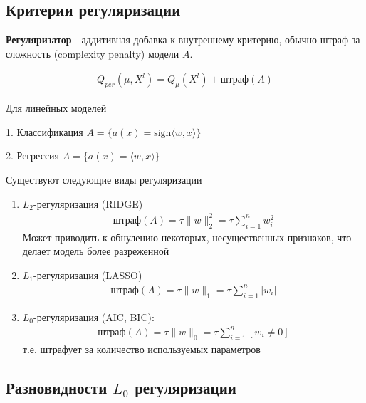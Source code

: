 \subsection*{Критерии регуляризации}

\par \textbf{Регуляризатор} - аддитивная добавка к внутреннему критерию, обычно штраф за сложность (complexity penalty) модели $A$.

\begin{align*}
    Q_{per} (\mu, X^l) = Q_{\mu}(X^l) + \text{штраф}(A)
\end{align*}


\par Для линейных моделей

1. Классификация $A = \{a(x) = \text{sign}\langle w, x \rangle\}$

2. Регрессия $A = \{a(x) = \langle w, x \rangle \}$

\par Существуют следующие виды регуляризации

\begin{enumerate}
    \item $L_2$-регуляризация (RIDGE)
          \begin{align*}
              \text{штраф}(A) =  \tau \|w\|_2^2 = \tau \sum\limits_{i = 1}^n w_i^2
          \end{align*}
          Может приводить к обнулению некоторых, несущественных признаков, что делает модель более разреженной
    \item $L_1$-регуляризация (LASSO)
          \begin{align*}
              \text{штраф}(A) = \tau \|w\|_1 = \tau \sum\limits_{i = 1}^n |w_i|
          \end{align*}
    \item $L_0$-регуляризация (AIC, BIC):
          \begin{align*}
              \text{штраф}(A) = \tau\|w\|_0 = \tau\sum\limits_{i = 1}^n [w_i \neq 0]
          \end{align*}
          т.е. штрафует за количество используемых параметров
\end{enumerate}

\subsection*{Разновидности $L_0$ регуляризации}

